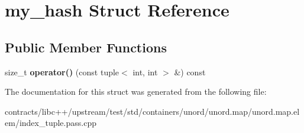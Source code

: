 \hypertarget{structmy__hash}{}\section{my\+\_\+hash Struct Reference}
\label{structmy__hash}
\subsection*{Public Member Functions}
\begin{DoxyCompactItemize}
\item 
\mbox{\label{structmy__hash_a258277bb7b266fd461851c3040e02f34}} 
size\+\_\+t {\bfseries operator()} (const tuple$<$ int, int $>$ \&) const
\end{DoxyCompactItemize}


The documentation for this struct was generated from the following file\+:\begin{DoxyCompactItemize}
\item 
contracts/libc++/upstream/test/std/containers/unord/unord.\+map/unord.\+map.\+elem/index\+\_\+tuple.\+pass.\+cpp\end{DoxyCompactItemize}
